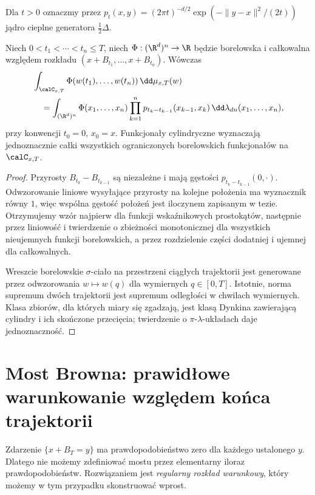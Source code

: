 Dla $t>0$ oznaczmy przez
$p_t(x,y)=(2\pi t)^{-d/2}\exp(-\|y-x\|^2/(2t))$
jądro cieplne generatora $\frac12\Delta$.

\begin{twierdzenie}
\label{th:path-cylinder}
Niech $0<t_1<\cdots<t_n\le T$, niech
$\Phi:(\R^d)^n\to\R$ będzie borelowska i całkowalna
względem rozkładu $(x+B_{t_1},\ldots,x+B_{t_n})$.
Wówczas
\[
\begin{split}
 &\int_{\calC_{x,T}}\Phi(w(t_1),\ldots,w(t_n))\,
       \dd\mu_{x,T}(w)\\
 &\quad=\int_{(\R^d)^n}\Phi(x_1,\ldots,x_n)
   \prod_{k=1}^n p_{t_k-t_{k-1}}(x_{k-1},x_k)
   \,\dd\lambda_{dn}(x_1,\ldots,x_n),
\end{split}
\]
przy konwencji $t_0=0$, $x_0=x$. Funkcjonały cylindryczne
wyznaczają jednoznacznie całki wszystkich ograniczonych
borelowskich funkcjonałów na $\calC_{x,T}$.
\end{twierdzenie}
\begin{proof}
Przyrosty $B_{t_k}-B_{t_{k-1}}$ są niezależne i mają gęstości
$p_{t_k-t_{k-1}}(0,\cdot)$. Odwzorowanie liniowe wysyłające
przyrosty na kolejne położenia ma wyznacznik równy $1$,
więc wspólna gęstość położeń jest iloczynem zapisanym w tezie.
Otrzymujemy wzór najpierw dla funkcji wskaźnikowych
prostokątów, następnie przez liniowość i twierdzenie o
zbieżności monotonicznej dla wszystkich nieujemnych
funkcji borelowskich, a przez rozdzielenie części dodatniej
i ujemnej dla całkowalnych.

Wreszcie borelowskie $\sigma$-ciało na przestrzeni
ciągłych trajektorii jest generowane przez odwzorowania
$w\mapsto w(q)$ dla wymiernych $q\in[0,T]$.
Istotnie, norma supremum dwóch trajektorii jest supremum
odległości w chwilach wymiernych. Klasa zbiorów, dla
których miary się zgadzają, jest klasą Dynkina zawierającą
cylindry i ich skończone przecięcia; twierdzenie o
$\pi$-$\lambda$-układach daje jednoznaczność.
\end{proof}

\section{Most Browna: prawidłowe warunkowanie względem końca trajektorii}

Zdarzenie $\{x+B_T=y\}$ ma prawdopodobieństwo zero dla
każdego ustalonego $y$. Dlatego nie możemy zdefiniować mostu
przez elementarny iloraz prawdopodobieństw.
Rozwiązaniem jest \emph{regularny rozkład warunkowy}, który
możemy w tym przypadku skonstruować wprost.


